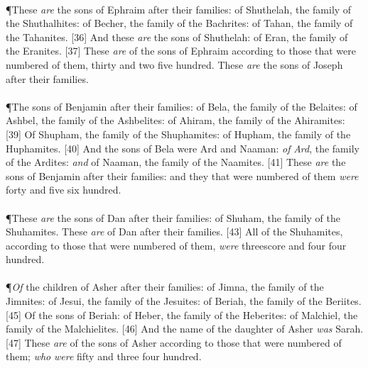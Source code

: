 \\
\P \textcolor[cmyk]{0.99998,1,0,0}{These \emph{are} the sons of Ephraim after their families: of Shuthelah, the family of the Shuthalhites: of Becher, the family of the Bachrites: of Tahan, the family of the Tahanites.}
[36] \textcolor[cmyk]{0.99998,1,0,0}{And these \emph{are} the sons of Shuthelah: of Eran, the family of the Eranites.}
[37] \textcolor[cmyk]{0.99998,1,0,0}{These \emph{are}  of the sons of Ephraim according to those that were numbered of them, thirty and two  five hundred. These \emph{are} the sons of Joseph after their families.}\\
\\
\P \textcolor[cmyk]{0.99998,1,0,0}{The sons of Benjamin after their families: of Bela, the family of the Belaites: of Ashbel, the family of the Ashbelites: of Ahiram, the family of the Ahiramites:}
[39] \textcolor[cmyk]{0.99998,1,0,0}{Of Shupham, the family of the Shuphamites: of Hupham, the family of the Huphamites.}
[40] \textcolor[cmyk]{0.99998,1,0,0}{And the sons of Bela were Ard and Naaman: \emph{of} \emph{Ard}, the family of the Ardites: \emph{and} of Naaman, the family of the Naamites.}
[41] \textcolor[cmyk]{0.99998,1,0,0}{These \emph{are} the sons of Benjamin after their families: and they that were numbered of them \emph{were} forty and five  six hundred.}\\
\\
\P \textcolor[cmyk]{0.99998,1,0,0}{These \emph{are} the sons of Dan after their families: of Shuham, the family of the Shuhamites. These \emph{are}  of Dan after their families.}
[43] \textcolor[cmyk]{0.99998,1,0,0}{All  of the Shuhamites, according to those that were numbered of them, \emph{were} threescore and four  four hundred.}\\
\\
\P \textcolor[cmyk]{0.99998,1,0,0}{\emph{Of} the children of Asher after their families: of Jimna, the family of the Jimnites: of Jesui, the family of the Jesuites: of Beriah, the family of the Beriites.}
[45] \textcolor[cmyk]{0.99998,1,0,0}{Of the sons of Beriah: of Heber, the family of the Heberites: of Malchiel, the family of the Malchielites.}
[46] \textcolor[cmyk]{0.99998,1,0,0}{And the name of the daughter of Asher \emph{was} Sarah.}
[47] \textcolor[cmyk]{0.99998,1,0,0}{These \emph{are}  of the sons of Asher according to those that were numbered of them; \emph{who} \emph{were} fifty and three  four hundred.}\\
